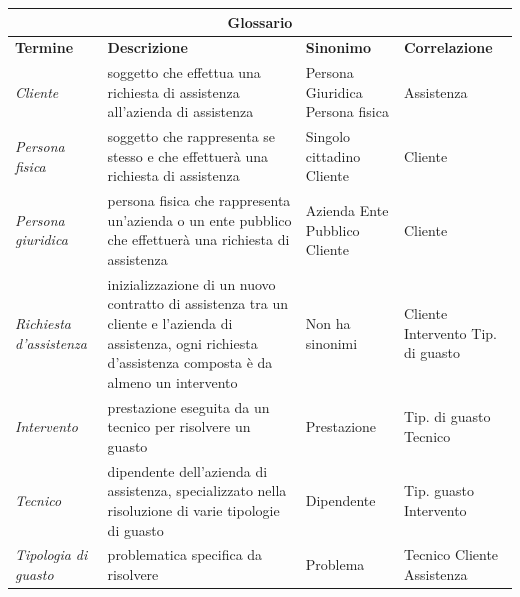 \documentclass[legalpaper]{article}
\begin{document}
\begin{tabular}{ |p{1.8cm}|p{8cm}|p{3cm}|p{2.5cm}| }
\hline
\multicolumn{4}{|c|}{\textbf{Glossario}} \\
\hline
\textbf{Termine} & \textbf{Descrizione} & \textbf{Sinonimo} & \textbf{Correlazione} \\
\hline
\textit{Cliente} &  soggetto che effettua una richiesta di assistenza all'azienda di assistenza & Persona Giuridica \newline Persona fisica & Assistenza\\
\hline

\textit{Persona \newline fisica} &  soggetto che rappresenta se stesso e che effettuerà una richiesta di assistenza &  Singolo cittadino \newline Cliente &  Cliente \\ \hline

\textit{Persona \newline giuridica} &  persona fisica che rappresenta un'azienda o un ente pubblico che effettuerà una richiesta di assistenza & Azienda \newline Ente Pubblico \newline Cliente &  Cliente \\ \hline

\textit{Richiesta d'assistenza} & inizializzazione di un nuovo contratto di assistenza tra un cliente e l'azienda di assistenza, ogni richiesta d'assistenza composta è da almeno un intervento   & Non ha sinonimi & Cliente \newline Intervento \newline Tip. di guasto \\ \hline

\textit{Intervento} & prestazione eseguita da un tecnico per risolvere un guasto & Prestazione & Tip. di guasto \newline Tecnico \\ \hline

\textit{Tecnico}  & dipendente dell'azienda di assistenza, specializzato nella risoluzione di varie tipologie di guasto & Dipendente & Tip. guasto \newline Intervento \\ \hline

\textit{Tipologia di guasto}  & problematica specifica da risolvere  & Problema &  Tecnico  \newline Cliente \newline Assistenza \\ \hline

\end{tabular}
\pagebreak
\end{document}
